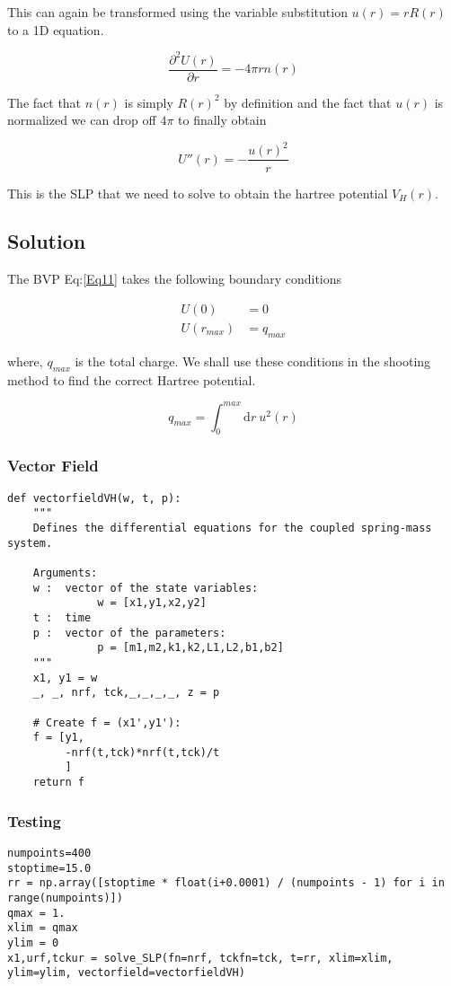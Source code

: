 \documentclass[11pt,a4paper]{article}
\begin{document}
This can again be transformed using the variable substitution
\(u(r)=rR(r)\) to a 1D equation.

\[
\frac{\partial^2 U(r)}{\partial r} = -4\pi r n(r)
\]

The fact that \(n(r)\) is simply \(R(r)^2\) by definition and the
fact that \(u(r)\) is normalized we can drop off \(4\pi\) to finally
obtain

\[
U''(r) = -\frac{u(r)^2}{r}
\]

This is the SLP that we need to solve to obtain the
hartree potential \(V_H(r)\).

\subsection{Solution}
\label{sec:org3f249d0}

The BVP Eq:\ref{Eq11} takes the following boundary conditions

\begin{align*}
U(0) &= 0\\
U(r_{max}) &= q_{max}
\end{align*}

where, \(q_{max}\) is the total charge. We shall use these conditions
in the shooting method to find the correct Hartree potential.

\[
q_{max} = \int_0^{max} \text{d}r\ u^2(r)
\]

\subsubsection{Vector Field}
\label{sec:orgdaf50c6}
\begin{verbatim}
def vectorfieldVH(w, t, p):
    """
    Defines the differential equations for the coupled spring-mass system.

    Arguments:
    w :  vector of the state variables:
              w = [x1,y1,x2,y2]
    t :  time
    p :  vector of the parameters:
              p = [m1,m2,k1,k2,L1,L2,b1,b2]
    """
    x1, y1 = w
    _, _, nrf, tck,_,_,_,_, z = p

    # Create f = (x1',y1'):
    f = [y1,
         -nrf(t,tck)*nrf(t,tck)/t
         ]
    return f
\end{verbatim}
\subsubsection{Testing}
\label{sec:orgd858ea1}
\begin{verbatim}
numpoints=400
stoptime=15.0
rr = np.array([stoptime * float(i+0.0001) / (numpoints - 1) for i in range(numpoints)])
qmax = 1.
xlim = qmax
ylim = 0
x1,urf,tckur = solve_SLP(fn=nrf, tckfn=tck, t=rr, xlim=xlim, ylim=ylim, vectorfield=vectorfieldVH)
\end{verbatim}
\end{document}
